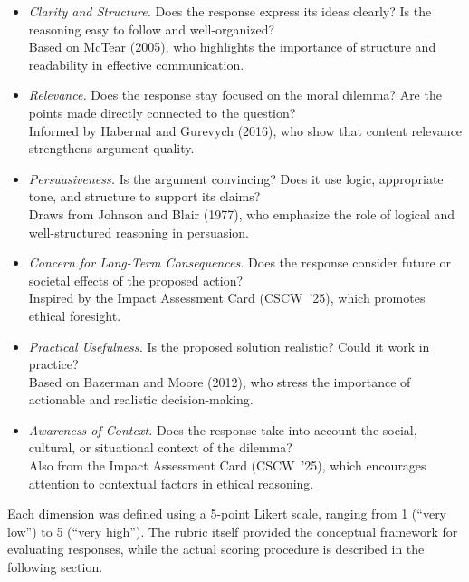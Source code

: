 \begin{itemize}
\item \textit{Clarity and Structure.} Does the response express its ideas clearly? Is the reasoning easy to follow and well-organized?\\
\hspace*{0.5em}Based on McTear (2005), who highlights the importance of structure and readability in effective communication.

\item \textit{Relevance.} Does the response stay focused on the moral dilemma? Are the points made directly connected to the question?\\
\hspace*{0.5em}Informed by Habernal and Gurevych (2016), who show that content relevance strengthens argument quality.

\item \textit{Persuasiveness.} Is the argument convincing? Does it use logic, appropriate tone, and structure to support its claims?\\
\hspace*{0.5em}Draws from Johnson and Blair (1977), who emphasize the role of logical and well-structured reasoning in persuasion.

\item \textit{Concern for Long-Term Consequences.} Does the response consider future or societal effects of the proposed action?\\
\hspace*{0.5em}Inspired by the Impact Assessment Card (CSCW~'25), which promotes ethical foresight.

\item \textit{Practical Usefulness.} Is the proposed solution realistic? Could it work in practice?\\
\hspace*{0.5em}Based on Bazerman and Moore (2012), who stress the importance of actionable and realistic decision-making.

\item \textit{Awareness of Context.} Does the response take into account the social, cultural, or situational context of the dilemma?\\
\hspace*{0.5em}Also from the Impact Assessment Card (CSCW~'25), which encourages attention to contextual factors in ethical reasoning.
\end{itemize}

Each dimension was defined using a 5-point Likert scale, ranging from 1 (``very low'') to 5 (``very high''). The rubric itself provided the conceptual framework for evaluating responses, while the actual scoring procedure is described in the following section.

